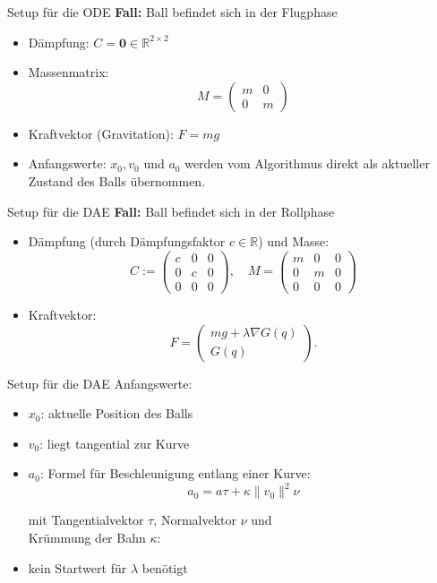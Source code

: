 \documentclass[aspectratio=169]{beamer}
\begin{document}
\begin{frame}{Setup für die ODE}
\textbf{Fall:} Ball befindet sich in der Flugphase\\
\pause
\vspace{0.3cm}
	\begin{itemize}
		\item Dämpfung: $C = \mathbf{0} \in \mathbb{R}^{2 \times 2}$
		\item Massenmatrix:
		\[
		M =
		\begin{pmatrix}
			m & 0 \\
			0 & m
		\end{pmatrix}
		\]
		\item Kraftvektor (Gravitation): \quad $F = m g$
		\item Anfangswerte: $x_0, v_0$ und $a_0$ werden vom Algorithmus direkt als aktueller Zustand des Balls übernommen.
	\end{itemize}
\end{frame}

\begin{frame}{Setup für die DAE}
\textbf{Fall:} Ball befindet sich in der Rollphase\\
\pause
\vspace{0.3cm}
\begin{itemize}
	\item Dämpfung (durch Dämpfungsfaktor $c \in \mathbb{R}$) und Masse:
	\begin{equation*}
		C :=
		\begin{pmatrix}
			c & 0 & 0\\
			0 & c & 0\\
			0 & 0 & 0
		\end{pmatrix},
		\quad
		M =
		\begin{pmatrix}
			m & 0 & 0 \\
			0 & m & 0 \\
			0 & 0 & 0
		\end{pmatrix}
	\end{equation*}
	\item Kraftvektor:
	\[F =
	\begin{pmatrix}
		mg + \lambda \nabla G(q)\\
		G(q)
	\end{pmatrix}.
	\]
\end{itemize}
\end{frame}

\begin{frame}{Setup für die DAE}
Anfangswerte:
\begin{itemize}
	\item $x_0$: aktuelle Position des Balls
	\item $v_0$: liegt tangential zur Kurve
	\item $a_0$: Formel für Beschleunigung entlang einer Kurve:
	\[
	a_0 = a \tau + \kappa \| v_0 \|^2 \nu
	\]

	\qquad mit Tangentialvektor $\tau$, Normalvektor $\nu$ und\\
	\qquad Krümmung der Bahn $\kappa$:

	\item kein Startwert für $\lambda$ benötigt
\end{itemize}
\end{frame}
\end{document}
